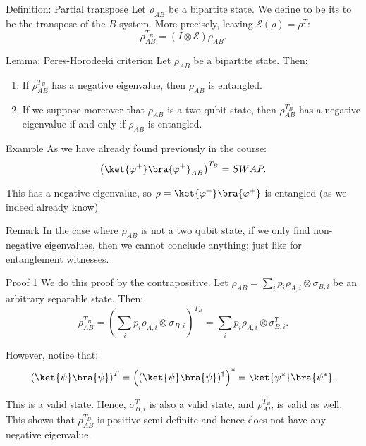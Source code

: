 \documentclass[a4paper]{article}
\begin{document}
\begin{parag}{Definition: Partial transpose}
    Let $\rho_{AB}$ be a bipartite state. We define to be its  to be the transpose of the $B$ system. More precisely, leaving $\mathcal{E}\left(\rho\right) = \rho^T$: 
    \[\rho_{AB}^{T_B} = \left(I \otimes \mathcal{E}\right) \rho_{AB}.\]
\end{parag}

\begin{parag}{Lemma: Peres-Horodeeki criterion}
    Let $\rho_{AB}$ be a bipartite state. Then:
    \begin{enumerate}
        \item If $\rho_{AB}^{T_B}$ has a negative eigenvalue, then $\rho_{AB}$ is entangled.
        \item If we suppose moreover that $\rho_{AB}$ is a two qubit state, then $\rho_{AB}^{T_B}$ has a negative eigenvalue if and only if $\rho_{AB}$ is entangled.
    \end{enumerate}

    \begin{subparag}{Example}
        As we have already found previously in the course: 
        \[\left(\ket{\phi^+}\bra{\phi^+}_{AB}\right)^{T_B} = SWAP.\]
        
        This has a negative eigenvalue, so $\rho = \ket{\phi^+}\bra{\phi^+}$ is entangled (as we indeed already know) 
    \end{subparag}

    \begin{subparag}{Remark}
        In the case where $\rho_{AB}$ is not a two qubit state, if we only find non-negative eigenvalues, then we cannot conclude anything; just like for entanglement witnesses.
    \end{subparag}
    
    \begin{subparag}{Proof 1}
        We do this proof by the contrapositive. Let $\rho_{AB} = \sum_{i} p_i \rho_{A, i} \otimes \sigma_{B, i}$ be an arbitrary separable state. Then:
        \[\rho_{AB}^{T_B} = \left(\sum_{i} p_i \rho_{A, i} \otimes \sigma_{B, i}\right)^{T_B} = \sum_{i} p_i \rho_{A, i} \otimes \sigma_{B, i}^T.\]

        However, notice that:
        \[\left(\ket{\psi}\bra{\psi}\right)^T = \left(\left(\ket{\psi}\bra{\psi}\right)^{\dagger}\right)^* = \ket{\psi^*}\bra{\psi^*}.\]

        This is a valid state. Hence, $\sigma_{B, i}^{T}$ is also a valid state, and $\rho_{AB}^{T_B}$ is valid as well. This shows that $\rho_{AB}^{T_B}$ is positive semi-definite and hence does not have any negative eigenvalue.
    \end{subparag}


\end{parag}
\end{document}
